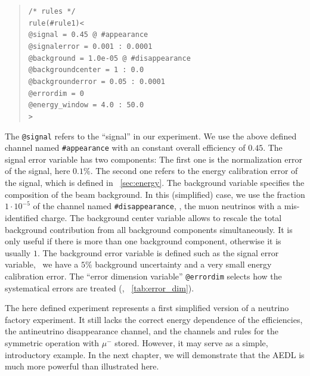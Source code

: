 \begin{quote}
{\tt /* rules */}\\
{\tt rule(\#rule1)<}\\
{\tt \tb @signal = 0.45 @ \#appearance}\\
{\tt \tb @signalerror = 0.001 : 0.0001}\\
{\tt \tb @background = 1.0e-05 @ \#disappearance}\\
{\tt \tb @backgroundcenter = 1 : 0.0}\\
{\tt \tb @backgrounderror = 0.05 : 0.0001}\\
{\tt \tb @errordim = 0}\\
{\tt \tb @energy\_window = 4.0 : 50.0}\\
{\tt >}
\end{quote}
The {\tt @signal} refers to the ``signal'' in our experiment. We use the
above defined channel named {\tt \#appearance} with an constant overall
efficiency of $0.45$. The signal error variable has two components: 
The first one is the normalization error of the signal, here $0.1\%$. The second 
one refers to the energy calibration error of the signal, which is defined 
in \Sec~\ref{sec:energy}. The background variable
specifies the composition of the beam background. In this (simplified) case, we
use the fraction $1\cdot 10^{-5}$ of the channel named {\tt \#disappearance}, \ie , the muon neutrinos with a mis-identified charge. The background center variable allows to rescale the total background contribution from all background components
simultaneously. It is only useful if there is more than one background component, otherwise it is usually $1$. The background error variable is defined such as the signal error variable, \ie\ we have a $5\%$ background uncertainty and a very small energy calibration error. The ``error dimension variable'' {\tt @errordim} selects how the systematical errors are treated (\cf, \Tab~\ref{tab:error_dim}). 

The here defined experiment represents a first simplified version of a neutrino factory experiment. It still lacks the correct energy dependence of the efficiencies, the antineutrino disappearance channel, and the channels and rules for the symmetric operation with $\mu^-$ stored. However, it may serve as a simple, introductory example. In the next chapter, we will demonstrate that the AEDL is much more powerful than illustrated here.



